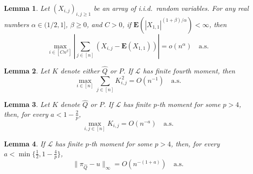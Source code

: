 \documentclass[10pt,a4paper]{amsart}
\newtheorem{lemma}{Lemma}
\newcommand{\E}{\mathbf{E}}
\newcommand\wh[1]{\widehat{#1}}
\begin{document}
\begin{lemma}\label{lem:bai yin}
Let $(X_{i,j})_{i, j \geq 1}$ be an array of i.i.d.\ random variables. For any real numbers $\alpha \in (1/2,1]$, $\beta \geq 0$, and $C > 0$, if $\E(|X_{1,1}|^{(1+\beta)/\alpha}) < \infty$, then
\[
		\max_{i \in [Cn^\beta]} \left| \sum_{j \in [n]} (X_{i,j} - \E (X_{1,1})) \right| = o(n^{\alpha}) \quad \mathrm{a.s.}
\]
\end{lemma}

\begin{lemma}\label{lem:l2 control}
Let $K$ denote either $\wh{Q}$ or $P$. If $\mathcal{L}$ has finite fourth moment, then
\[
	\max_{i \in [n]} \sum_{j \in [n]} K_{i,j}^{\,2} = O(n^{-1}) \quad \mathrm{a.s.}
\]
\end{lemma}

\begin{lemma}\label{lem:max control}
Let $K$ denote $\wh{Q}$ or $P$. If $\mathcal{L}$ has finite $p$-th moment for some $p >4$, then, for every $a < 1 - \frac{2}{p}$,
\[
	\max_{i,j \in [n]} K_{i,j} = O (n^{-a}) \quad \mathrm{a.s.}
\]
\end{lemma}

\begin{lemma}\label{lemma:P l_infty}
If $\mathcal{L}$ has finite $p$-th moment for some $p > 4$, then, for every $a < \min\{\frac12,1-\frac{4}{p}\}$,
\begin{equation}\label{eq:P l_infty}
	\| \pi_{\wh{Q}} - u \|_\infty = O(n^{-(1+a)}) \quad \mathrm{a.s.}
\end{equation}
\end{lemma}
\end{document}
